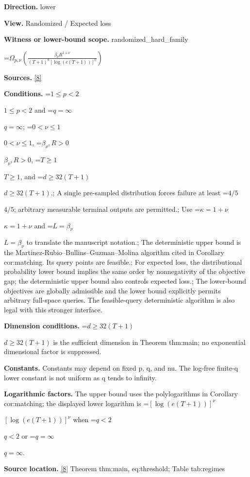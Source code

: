 \documentclass[10pt,a4paper]{article}
\newcommand{\AtlasMath}[1]{\par\begingroup\centering\setbox0=\hbox{$\displaystyle #1$}\ifdim\wd0>1.4\linewidth\typeout{ATLAS WIDE FORMULA: \the\wd0}\fi\ifdim\wd0>\linewidth\resizebox{\linewidth}{!}{\box0}\else\box0\fi\par\endgroup}
\newcommand{\AtlasInlineMath}[1]{\begingroup\setbox0=\hbox{$#1$}\ifdim\wd0>.4\linewidth\endgroup\AtlasMath{#1}\else\endgroup$#1$\fi}
\begin{document}
\textbf{Direction.} lower



\textbf{View.} Randomized / Expected loss



\textbf{Witness or lower-bound scope.} randomized\_hard\_family



\AtlasMath{\Omega_{p,\nu}\!\left(\frac{\beta_\nu R^{1+\nu}}{(T+1)^a[\log(e(T+1))]^\nu}\right)}


\textbf{Sources.} \href{https://github.com/WU-Wendao/Colombo/blob/main/colombo_sensorium/Complexity_altas/data/sources/colombo/B1/manuscript.pdf}{[8]}



\textbf{Conditions.} \AtlasInlineMath{1\le p<2} and \AtlasInlineMath{q=\infty}; \AtlasInlineMath{0<\nu\le1}, \AtlasInlineMath{\beta_\nu,R>0}, \AtlasInlineMath{T\ge1}, and \AtlasInlineMath{d\ge32(T+1)}.; A single pre-sampled distribution forces failure at least \AtlasInlineMath{4/5}; arbitrary measurable terminal outputs are permitted.; Use \AtlasInlineMath{\kappa=1+\nu} and \AtlasInlineMath{L=\beta_\nu} to translate the manuscript notation.; The deterministic upper bound is the Martinez-Rubio--Bullins--Guzman--Molina algorithm cited in Corollary cor:matching. Its query points are feasible.; For expected loss, the distributional probability lower bound implies the same order by nonnegativity of the objective gap; the deterministic upper bound also controls expected loss.; The lower-bound objectives are globally admissible and the lower bound explicitly permits arbitrary full-space queries. The feasible-query deterministic algorithm is also legal with this stronger interface.



\textbf{Dimension conditions.} \AtlasInlineMath{d\ge32(T+1)} is the sufficient dimension in Theorem thm:main; no exponential dimensional factor is suppressed.



\textbf{Constants.} Constants may depend on fixed p, q, and nu. The log-free finite-q lower constant is not uniform as q tends to infinity.



\textbf{Logarithmic factors.} The upper bound uses the polylogarithms in Corollary cor:matching; the displayed lower logarithm is \AtlasInlineMath{[\log(e(T+1))]^\nu} when \AtlasInlineMath{q<2} or \AtlasInlineMath{q=\infty}.



\textbf{Source location.} \href{https://github.com/WU-Wendao/Colombo/blob/main/colombo_sensorium/Complexity_altas/data/sources/colombo/B1/manuscript.pdf}{[8]} Theorem thm:main, eq:threshold; Table tab:regimes
\end{document}
